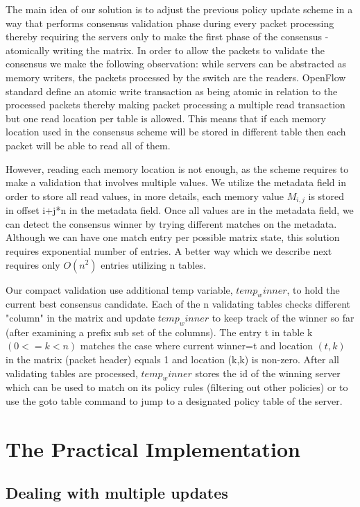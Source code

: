 \documentclass[conference]{sigcomm-alternate}
\begin{document}
The main idea of our solution is to adjust the previous policy update scheme in a way that performs consensus validation phase during every packet processing thereby requiring the servers only to make the first phase of the consensus - atomically writing the matrix.
In order to allow the packets to validate the consensus we make the following observation: while servers can be abstracted as memory writers, the packets processed by the switch are the readers. OpenFlow standard define an atomic write transaction as being atomic in relation to the processed packets thereby making packet processing a multiple read transaction but one read location per table is allowed. This means that if each memory location used in the consensus scheme will be stored in different table then each packet will be able to read all of them.

However, reading each memory location is not enough, as the scheme requires to make a validation that involves multiple values. We utilize the metadata field in order to store all read values, in more details, each memory value $M_{i,j}$ is stored in offset i+j*n in the metadata field. Once all values are in the metadata field, we can detect the consensus winner by trying different matches on the metadata. Although we can have one match entry per possible matrix state, this solution requires exponential number of entries. A better way which we describe next requires only $O(n^2)$ entries utilizing n tables.

Our compact validation use additional temp variable, $temp_winner$, to hold the current best consensus candidate. Each of the n validating tables checks different "column" in the matrix and update $temp_winner$ to keep track of the winner so far (after examining a prefix sub set of the columns). The entry t in table k $(0<=k<n)$  matches the case where current winner=t and location $(t,k)$ in the matrix (packet header) equals 1 and location (k,k) is non-zero. After all validating tables are processed, $temp_winner$ stores the id of the winning server which can be used to match on its policy rules (filtering out other policies) or to use the goto table command to jump to a designated policy table of the server.


\section{The Practical Implementation}\label{sec:extension}

\subsection{Dealing with multiple updates}
\end{document}
